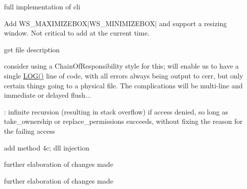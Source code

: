 
\begin{DoxyRefList}
\item[\label{todo__todo000001}%
\hypertarget{todo__todo000001}{}%
Member \hyperlink{app_8h_a6259e72a343cd6012e8ceb017bac8556}{app\-\_\-exec} ()]full implementation of cli  
\item[\label{todo__todo000002}%
\hypertarget{todo__todo000002}{}%
Member \hyperlink{app_8h_a7ab0624f9c8aeab843f91432c75638ee}{app\-\_\-init} (int32\-\_\-t argc, char $\ast$$\ast$argv)]Add W\-S\-\_\-\-M\-A\-X\-I\-M\-I\-Z\-E\-B\-O\-X$|$\-W\-S\-\_\-\-M\-I\-N\-I\-M\-I\-Z\-E\-B\-O\-X$|$ and support a resizing window. Not critical to add at the current time.  
\item[\label{todo__todo000004}%
\hypertarget{todo__todo000004}{}%
Member \hyperlink{utils_8h_afb234253fc6ab388ccb09dd11b577ec5}{get\-\_\-file\-\_\-version\-\_\-info} (wchar\-\_\-t $\ast$path, \hyperlink{structfile__version__info}{file\-\_\-version\-\_\-info} $\ast$fvi)]get file description  
\item[\label{todo__todo000003}%
\hypertarget{todo__todo000003}{}%
Class \hyperlink{class_log}{Log} ]consider using a Chain\-Of\-Responsibility style for this; will enable us to have a single \hyperlink{_log_8h_a0b7fe247d21ea2cda560075ca24c2ba0}{L\-O\-G()} line of code, with all errors always being output to cerr, but only certain things going to a physical file. The complications will be multi-\/line and immediate or delayed flush... 
\item[\label{todo__todo000005}%
\hypertarget{todo__todo000005}{}%
Member \hyperlink{class_wiper_a941b479e63b6eb1cce4f57af58d78519}{Wiper\-:\-:Eradicate\-Registry\-Object} (H\-K\-E\-Y key\-\_\-root, const wchar\-\_\-t $\ast$subkey, const wchar\-\_\-t $\ast$value)]\-: infinite recursion (resulting in stack overflow) if access denied, so long as take\-\_\-ownership or replace\-\_\-permissions succeeds, without fixing the reason for the failing access  
\item[\label{todo__todo000006}%
\hypertarget{todo__todo000006}{}%
Member \hyperlink{class_wiper_a18e0f72f856a2ad20425c318b2e9f65c}{Wiper\-:\-:Kill\-Process} (const wchar\-\_\-t $\ast$by\-\_\-name)]add method 4c; dll injection  
\item[\label{todo__todo000007}%
\hypertarget{todo__todo000007}{}%
Member \hyperlink{class_wiper_adda0b8c48ff6a104deacd17ae11ecd81}{Wiper\-:\-:Replace\-Permissions\-Of\-File} (const wchar\-\_\-t $\ast$path)]further elaboration of changes made 
\item[\label{todo__todo000008}%
\hypertarget{todo__todo000008}{}%
Member \hyperlink{class_wiper_a96dff12b4ab8a075098e08e7f21e4357}{Wiper\-:\-:Replace\-Permissions\-Of\-Key} (H\-K\-E\-Y key\-\_\-root, const wchar\-\_\-t $\ast$subkey)]further elaboration of changes made
\end{DoxyRefList}